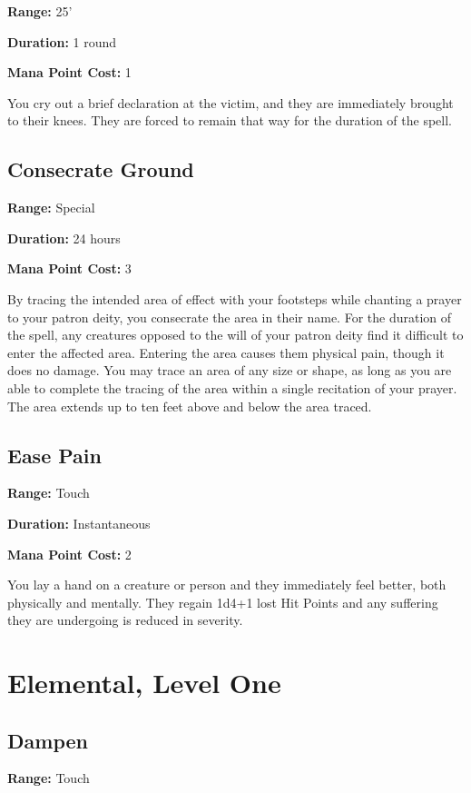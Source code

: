 \begin{multicols}{2}
\textbf{Range:} 25'

\textbf{Duration:} 1 round

\textbf{Mana Point Cost:} 1

You cry out a brief declaration at the victim, and they are
immediately brought to their knees. They are forced to remain
that way for the duration of the spell.

\subsection{Consecrate Ground}

\textbf{Range:} Special

\textbf{Duration:} 24 hours

\textbf{Mana Point Cost:} 3

By tracing the intended area of effect with your footsteps while
chanting a prayer to your patron deity, you consecrate the area
in their name. For the duration of the spell, any creatures opposed
to the will of your patron deity find it difficult to enter the
affected area. Entering the area causes them physical pain,
though it does no damage. You may trace an area of any size or
shape, as long as you are able to complete the tracing of the area
within a single recitation of your prayer. The area extends up to
ten feet above and below the area traced.

\subsection{Ease Pain}

\textbf{Range:} Touch

\textbf{Duration:} Instantaneous

\textbf{Mana Point Cost:} 2

You lay a hand on a creature or person and they immediately feel
better, both physically and mentally. They regain 1d4+1 lost Hit
Points and any suffering they are undergoing is reduced in
severity.

\section{Elemental, Level One}

\subsection{Dampen}

\textbf{Range:} Touch


\end{multicols}
